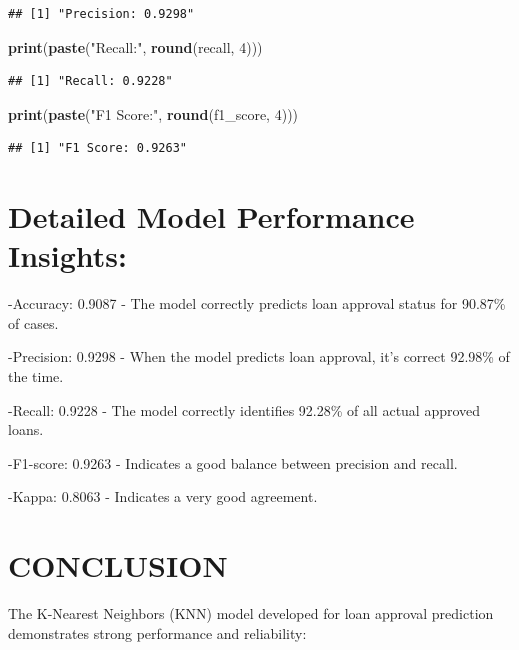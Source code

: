 \documentclass[
]{article}
\newenvironment{Shaded}{\begin{snugshade}}{\end{snugshade}}
\newcommand{\DecValTok}[1]{\textcolor[rgb]{0.00,0.00,0.81}{#1}}
\newcommand{\FunctionTok}[1]{\textcolor[rgb]{0.13,0.29,0.53}{\textbf{#1}}}
\newcommand{\NormalTok}[1]{#1}
\newcommand{\StringTok}[1]{\textcolor[rgb]{0.31,0.60,0.02}{#1}}
\begin{document}
\begin{verbatim}
## [1] "Precision: 0.9298"
\end{verbatim}

\begin{Shaded}
\begin{Highlighting}[]
\FunctionTok{print}\NormalTok{(}\FunctionTok{paste}\NormalTok{(}\StringTok{"Recall:"}\NormalTok{, }\FunctionTok{round}\NormalTok{(recall, }\DecValTok{4}\NormalTok{)))}
\end{Highlighting}
\end{Shaded}

\begin{verbatim}
## [1] "Recall: 0.9228"
\end{verbatim}

\begin{Shaded}
\begin{Highlighting}[]
\FunctionTok{print}\NormalTok{(}\FunctionTok{paste}\NormalTok{(}\StringTok{"F1 Score:"}\NormalTok{, }\FunctionTok{round}\NormalTok{(f1\_score, }\DecValTok{4}\NormalTok{)))}
\end{Highlighting}
\end{Shaded}

\begin{verbatim}
## [1] "F1 Score: 0.9263"
\end{verbatim}

\section{Detailed Model Performance
Insights:}\label{detailed-model-performance-insights}

-Accuracy: 0.9087 - The model correctly predicts loan approval status
for 90.87\% of cases.

-Precision: 0.9298 - When the model predicts loan approval, it's correct
92.98\% of the time.

-Recall: 0.9228 - The model correctly identifies 92.28\% of all actual
approved loans.

-F1-score: 0.9263 - Indicates a good balance between precision and
recall.

-Kappa: 0.8063 - Indicates a very good agreement.

\section{CONCLUSION}\label{conclusion}

The K-Nearest Neighbors (KNN) model developed for loan approval
prediction demonstrates strong performance and reliability:
\end{document}
